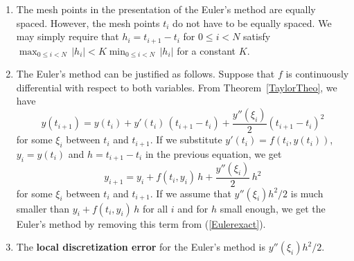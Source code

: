 \begin{rmkList}
\begin{enumerate}
\item The mesh points in the presentation of the Euler's method are
equally spaced.  However, the mesh points $t_i$ do not have to be 
equally spaced.  We may simply require that $h_i = t_{i+1} - t_i$ for
$0\leq i < N$ satisfy
$\displaystyle \max_{0\leq i <N}\,|h_i| < K \min_{0\leq i <N}\,|h_i|$
for a constant $K$.
\item The Euler's method can be justified as follows.  Suppose that $f$
is continuously differential with respect to both variables.
From Theorem~\ref{TaylorTheo}, we have
\[
y(t_{i+1}) = y(t_i) + y'(t_i)\,(t_{i+1} -t_i) +
\frac{y''(\xi_i)}{2}\left(t_{i+1} - t_i\right)^2
\]
for some $\xi_i$ between $t_i$ and $t_{i+1}$.  If we substitute
$y'(t_i) = f(t_i,y(t_i))$, $y_i= y(t_i)$ and $h=t_{i+1}-t_i$ in
the previous equation, we get
\begin{equation} \label{Eulerexact}
y_{i+1} = y_i + f(t_i,y_i)\,h + \frac{y''(\xi_i)}{2}\,h^2
\end{equation}
for some $\xi_i$ between $t_i$ and $t_{i+1}$.  If we assume that
$y''(\xi_i)h^2/2$ is much smaller than $y_i + f(t_i,y_i)\,h$ for all
$i$ and for $h$ small enough, we get the Euler's method by removing this
term from (\ref{Eulerexact}).
\item The
{\bfseries local discretization error} for the Euler's method is $y''(\xi_i)h^2/2$.
\end{enumerate}
\end{rmkList}

